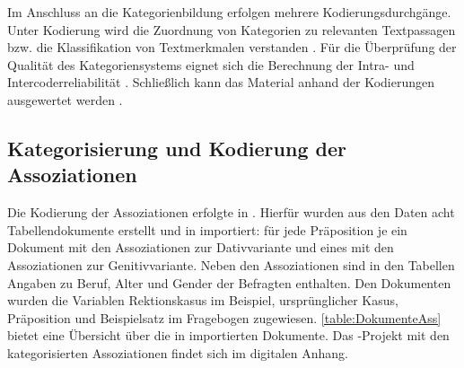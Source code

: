 Im Anschluss an die Kategorienbildung erfolgen mehrere Kodierungsdurchgänge. 
Unter Kodierung wird \glqq die Zuordnung von Kategorien zu relevanten Textpassagen bzw. die Klassifikation von Textmerkmalen verstanden\grqq{} \citep[56]{Kuckartz2010}. 
Für die Überprüfung der Qualität des Kategoriensystems eignet sich die Berechnung der Intra- und Intercoderreliabilität \citep[s.][49--50]{Kuckartz.2014}. Schließlich kann das Material anhand der Kodierungen ausgewertet werden \citep[s.][78]{Kuckartz.2014}. 
\subsection{Kategorisierung und Kodierung der Assoziationen}
\label{sec:KategorisierungAss}
Die Kodierung der Assoziationen erfolgte in \citet{MAXQDA.19892018}. Hierfür wurden aus den Daten acht Tabellendokumente erstellt und in \citeauthor{MAXQDA.19892018} importiert: 
für jede Präposition je ein Dokument mit den Assoziationen zur Dativvariante und eines mit den Assoziationen zur Genitivvariante. 
Neben den Assoziationen sind in den Tabellen Angaben zu Beruf, Alter und Gender der Befragten enthalten. 
Den Dokumenten wurden die Variablen \glqq Rektionskasus im Beispiel\grqq, \glqq ursprünglicher Kasus\grqq, \glqq Präposition\grqq{} und \glqq Beispielsatz im Fragebogen\grqq{} zugewiesen. 
\autoref{table:DokumenteAss} bietet eine Übersicht über die in \citeauthor{MAXQDA.19892018} importierten Dokumente. 
Das \citeauthor{MAXQDA.19892018}-Projekt mit den kategorisierten Assoziationen findet sich im digitalen Anhang. 
\largerpage[-1]

